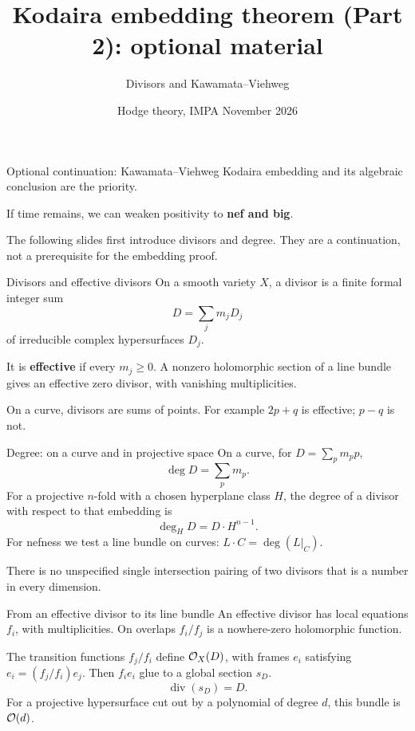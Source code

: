 
\title{Kodaira embedding theorem (Part 2): optional material}
\subtitle{Divisors and Kawamata--Viehweg}
\date{Hodge theory, IMPA  November 2026}


\begin{frame}{Optional continuation: Kawamata--Viehweg}
Kodaira embedding and its algebraic conclusion are the priority.
\par\bigskip
If time remains, we can weaken positivity to \textbf{nef and big}.
\par\medskip
The following slides first introduce divisors and degree. They are a continuation, not a prerequisite for the embedding proof.
\end{frame}

\begin{frame}{Divisors and effective divisors}
On a smooth variety \(X\), a divisor is a finite formal integer sum
\[
D=\sum_jm_jD_j
\]
of irreducible complex hypersurfaces \(D_j\).
\par\medskip
It is \textbf{effective} if every \(m_j\ge0\). A nonzero holomorphic section of a line bundle gives an effective zero divisor, with vanishing multiplicities.
\par\medskip
On a curve, divisors are sums of points. For example \(2p+q\) is effective; \(p-q\) is not.
\end{frame}

\begin{frame}{Degree: on a curve and in projective space}
On a curve, for \(D=\sum_pm_pp\),
\[
\deg D=\sum_pm_p.
\]
For a projective \(n\)-fold with a chosen hyperplane class \(H\), the degree of a divisor with respect to that embedding is
\[
\deg_H D=D\cdot H^{n-1}.
\]
For nefness we test a line bundle on curves: \(L\cdot C=\deg(L|_C)\).
\par\medskip
There is no unspecified single intersection pairing of two divisors that is a number in every dimension.
\end{frame}

\begin{frame}{From an effective divisor to its line bundle}
An effective divisor has local equations \(f_i\), with multiplicities.
On overlaps \(f_i/f_j\) is a nowhere-zero holomorphic function.
\par\medskip
The transition functions \(f_j/f_i\) define \(\mathcal O_X(D)\), with frames \(e_i\) satisfying \(e_i=(f_j/f_i)e_j\).
Then \(f_ie_i\) glue to a global section \(s_D\).
\[
\operatorname{div}(s_D)=D.
\]
For a projective hypersurface cut out by a polynomial of degree \(d\), this bundle is \(\mathcal O(d)\).
\end{frame}

